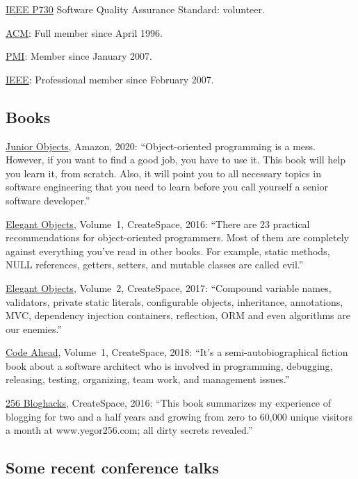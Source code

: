 \documentclass[12pt]{article}
\begin{document}
\href{http://ieeexplore.ieee.org/document/6835311/}{IEEE P730} Software Quality Assurance Standard: volunteer.

\href{https://www.acm.org}{ACM}: Full member since April 1996.

\href{https://certification.pmi.org/registry.aspx}{PMI}: Member since January 2007.

\href{https://www.ieee.org}{IEEE}: Professional member since February 2007.

\subsection*{Books}

\href{https://amzn.to/2u9BbqF}{Junior Objects}, Amazon, 2020:
``Object-oriented programming is a mess. However,
if you want to find a good job, you have to use it.
This book will help you learn it, from scratch.
Also, it will point you to all necessary topics
in software engineering that you need to learn before
you call yourself a senior software developer.''

\href{https://amzn.to/2E5UHqZ}{Elegant Objects}, Volume~1, CreateSpace, 2016:
``There are 23 practical recommendations for object-oriented programmers. Most of them are completely
against everything you've read in other books.
For example, static methods, NULL references, getters, setters, and
mutable classes are called evil.''

\href{https://amzn.to/2J2s5T4}{Elegant Objects}, Volume~2, CreateSpace, 2017:
``Compound variable names, validators, private static literals, configurable objects, inheritance,
annotations, MVC, dependency injection containers, reflection, ORM and even algorithms are our enemies.''

\href{https://amzn.to/2u9BbqF}{Code Ahead}, Volume~1, CreateSpace, 2018:
``It's a semi-autobiographical fiction book about a software architect
who is involved in programming, debugging, releasing, testing,
organizing, team work, and management issues.''

\href{https://amzn.to/2GkuyXf}{256 Bloghacks}, CreateSpace, 2016:
``This book summarizes my experience of blogging for two and a half years and growing from zero to 60,000
unique visitors a month at www.yegor256.com; all dirty secrets revealed.''

\subsection*{Some recent conference talks}
\end{document}
